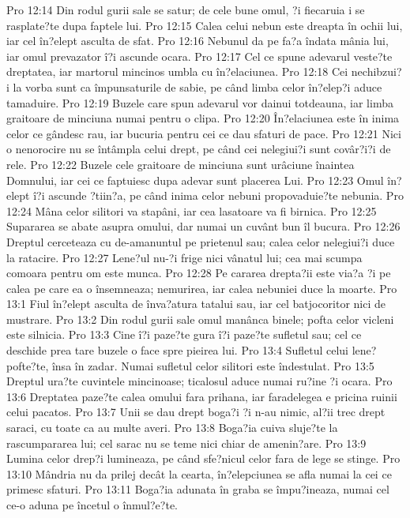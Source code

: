 Pro 12:14  Din rodul gurii sale se satur; de cele bune omul, ?i fiecaruia i se rasplate?te dupa faptele lui.
Pro 12:15  Calea celui nebun este dreapta în ochii lui, iar cel în?elept asculta de sfat.
Pro 12:16  Nebunul da pe fa?a îndata mânia lui, iar omul prevazator î?i ascunde ocara.
Pro 12:17  Cel ce spune adevarul veste?te dreptatea, iar martorul mincinos umbla cu în?elaciunea.
Pro 12:18  Cei nechibzui?i la vorba sunt ca împunsaturile de sabie, pe când limba celor în?elep?i aduce tamaduire.
Pro 12:19  Buzele care spun adevarul vor dainui totdeauna, iar limba graitoare de minciuna numai pentru o clipa.
Pro 12:20  În?elaciunea este în inima celor ce gândesc rau, iar bucuria pentru cei ce dau sfaturi de pace.
Pro 12:21  Nici o nenorocire nu se întâmpla celui drept, pe când cei nelegiui?i sunt covâr?i?i de rele.
Pro 12:22  Buzele cele graitoare de minciuna sunt urâciune înaintea Domnului, iar cei ce faptuiesc dupa adevar sunt placerea Lui.
Pro 12:23  Omul în?elept î?i ascunde ?tiin?a, pe când inima celor nebuni propovaduie?te nebunia.
Pro 12:24  Mâna celor silitori va stapâni, iar cea lasatoare va fi birnica.
Pro 12:25  Supararea se abate asupra omului, dar numai un cuvânt bun îl bucura.
Pro 12:26  Dreptul cerceteaza cu de-amanuntul pe prietenul sau; calea celor nelegiui?i duce la ratacire.
Pro 12:27  Lene?ul nu-?i frige nici vânatul lui; cea mai scumpa comoara pentru om este munca.
Pro 12:28  Pe cararea drepta?ii este via?a ?i pe calea pe care ea o însemneaza; nemurirea, iar calea nebuniei duce la moarte.
Pro 13:1  Fiul în?elept asculta de înva?atura tatalui sau, iar cel batjocoritor nici de mustrare.
Pro 13:2  Din rodul gurii sale omul manânca binele; pofta celor vicleni este silnicia.
Pro 13:3  Cine î?i paze?te gura î?i paze?te sufletul sau; cel ce deschide prea tare buzele o face spre pieirea lui.
Pro 13:4  Sufletul celui lene? pofte?te, însa în zadar. Numai sufletul celor silitori este îndestulat.
Pro 13:5  Dreptul ura?te cuvintele mincinoase; ticalosul aduce numai ru?ine ?i ocara.
Pro 13:6  Dreptatea paze?te calea omului fara prihana, iar faradelegea e pricina ruinii celui pacatos.
Pro 13:7  Unii se dau drept boga?i ?i n-au nimic, al?ii trec drept saraci, cu toate ca au multe averi.
Pro 13:8  Boga?ia cuiva sluje?te la rascumpararea lui; cel sarac nu se teme nici chiar de amenin?are.
Pro 13:9  Lumina celor drep?i lumineaza, pe când sfe?nicul celor fara de lege se stinge.
Pro 13:10  Mândria nu da prilej decât la cearta, în?elepciunea se afla numai la cei ce primesc sfaturi.
Pro 13:11  Boga?ia adunata în graba se împu?ineaza, numai cel ce-o aduna pe încetul o înmul?e?te.
